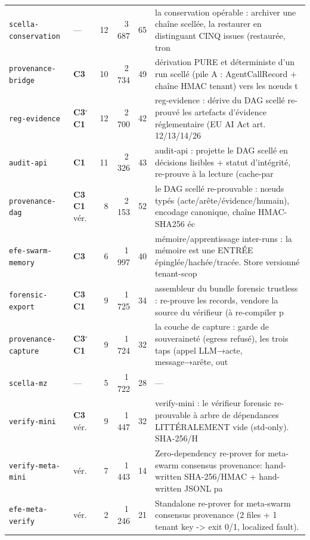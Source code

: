 \documentclass[10pt]{report}
\newcommand{\code}[1]{\texttt{\small #1}}
\newcommand{\ctrois}{\textcolor{c3col}{\textbf{C3}}}
\newcommand{\cun}{\textcolor{c1col}{\textbf{C1}}}
\begin{document}
\begin{longtable}{@{}p{4.3cm}p{1.6cm}r r r p{5.7cm}@{}}
\code{scella-conservation} & --- & 12 & 3\,687 & 65 & \footnotesize la conservation opérable : archiver une chaîne scellée, la restaurer en distinguant CINQ issues (restaurée, tron \\
\code{provenance-bridge} & \ctrois{} & 10 & 2\,734 & 49 & \footnotesize dérivation PURE et déterministe d'un run scellé (pile A : AgentCallRecord + chaîne HMAC tenant) vers les nœuds t \\
\code{reg-evidence} & \ctrois{}$^{\circ}$ \cun{} & 12 & 2\,700 & 42 & \footnotesize reg-evidence : dérive du DAG scellé re-prouvé les artefacts d'évidence réglementaire (EU AI Act art. 12/13/14/26 \\
\code{audit-api} & \cun{} & 11 & 2\,326 & 43 & \footnotesize audit-api : projette le DAG scellé en décisions lisibles + statut d'intégrité, re-prouve à la lecture (cache-par \\
\code{provenance-dag} & \ctrois{} \cun{} vér. & 8 & 2\,153 & 52 & \footnotesize le DAG scellé re-prouvable : nœuds typés (acte/arête/évidence/humain), encodage canonique, chaîne HMAC-SHA256 éc \\
\code{efe-swarm-memory} & \ctrois{} & 6 & 1\,997 & 40 & \footnotesize mémoire/apprentissage inter-runs : la mémoire est une ENTRÉE épinglée/hachée/tracée. Store versionné tenant-scop \\
\code{forensic-export} & \ctrois{} \cun{} & 9 & 1\,725 & 34 & \footnotesize assembleur du bundle forensic trustless : re-prouve les records, vendore la source du vérifieur (à re-compiler p \\
\code{provenance-capture} & \ctrois{}$^{\circ}$ \cun{} & 9 & 1\,724 & 32 & \footnotesize la couche de capture : garde de souveraineté (egress refusé), les trois taps (appel LLM→acte, message→arête, out \\
\code{scella-mz} & --- & 5 & 1\,722 & 28 & \footnotesize --- \\
\code{verify-mini} & \ctrois{} vér. & 9 & 1\,447 & 32 & \footnotesize verify-mini : le vérifieur forensic re-prouvable à arbre de dépendances LITTÉRALEMENT vide (std-only). SHA-256/H \\
\code{verify-meta-mini} & vér. & 7 & 1\,443 & 14 & \footnotesize Zero-dependency re-prover for meta-swarm consensus provenance: hand-written SHA-256/HMAC + hand-written JSONL pa \\
\code{efe-meta-verify} & vér. & 2 & 1\,246 & 21 & \footnotesize Standalone re-prover for meta-swarm consensus provenance (2 files + 1 tenant key -> exit 0/1, localized fault). \\

\end{longtable}
\end{document}
